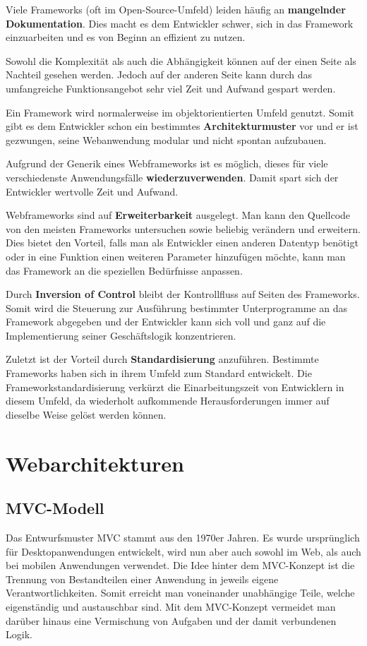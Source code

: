 Viele Frameworks (oft im Open-Source-Umfeld) leiden häufig an \textbf{mangelnder Dokumentation}. Dies macht es dem Entwickler schwer, sich in das Framework einzuarbeiten und es von Beginn an effizient zu nutzen.

Sowohl die Komplexität als auch die Abhängigkeit können auf der einen Seite als Nachteil gesehen werden. Jedoch auf der anderen Seite kann durch das umfangreiche Funktionsangebot sehr viel Zeit und Aufwand gespart werden.

Ein Framework wird normalerweise im objektorientierten Umfeld genutzt. Somit gibt es dem Entwickler schon ein bestimmtes \textbf{Architekturmuster} vor und er ist gezwungen, seine Webanwendung modular und nicht spontan aufzubauen.

Aufgrund der Generik eines Webframeworks ist es möglich, dieses für viele verschiedenste Anwendungsfälle \textbf{wiederzuverwenden}. Damit spart sich der Entwickler wertvolle Zeit und Aufwand.

Webframeworks sind auf \textbf{Erweiterbarkeit} ausgelegt. Man kann den Quellcode von den meisten Frameworks untersuchen sowie beliebig verändern und erweitern. Dies bietet den Vorteil, falls man als Entwickler einen anderen Datentyp benötigt oder in eine Funktion einen weiteren Parameter hinzufügen möchte, kann man das Framework an die speziellen Bedürfnisse anpassen.

Durch \textbf{Inversion of Control} bleibt der Kontrollfluss auf Seiten des Frameworks. Somit wird die Steuerung zur Ausführung bestimmter Unterprogramme an das Framework abgegeben und der Entwickler kann sich voll und ganz auf die Implementierung seiner Geschäftslogik konzentrieren.

Zuletzt ist der Vorteil durch \textbf{Standardisierung} anzuführen. Bestimmte Frameworks haben sich in ihrem Umfeld zum Standard entwickelt. Die Frameworkstandardisierung verkürzt die Einarbeitungszeit von Entwicklern in diesem Umfeld, da wiederholt aufkommende Herausforderungen immer auf dieselbe Weise gelöst werden können.\autocites[vgl.][313\psqq]{Schatten2010}

\section{Webarchitekturen}\label{sec:webarchitekturen}

\subsection{MVC-Modell}\label{MVC}
Das Entwurfsmuster MVC stammt aus den 1970er Jahren. Es wurde ursprünglich für Desktopanwendungen entwickelt, wird nun aber auch sowohl im Web, als auch bei mobilen Anwendungen verwendet. Die Idee hinter dem MVC-Konzept ist die Trennung von Bestandteilen einer Anwendung in jeweils eigene Verantwortlichkeiten. Somit erreicht man voneinander unabhängige Teile, welche eigenständig und austauschbar sind. Mit dem MVC-Konzept vermeidet man darüber hinaus eine Vermischung von Aufgaben und der damit verbundenen Logik.\autocites[vgl.][7\psqq]{Steyer2017}

